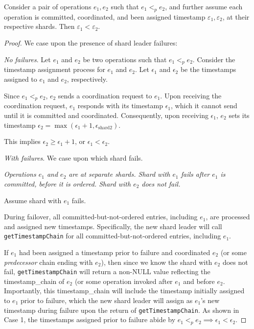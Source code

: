 

\begin{lem}
\label{lemma1}
Consider a pair of operations $e_1, e_2$ such that $e_1 <_p e_2$, and further assume each operation is committed, coordinated, and been assigned timestamp $\varepsilon_1, \varepsilon_2$, at their respective shards. Then $\varepsilon_1 < \varepsilon_2$.
\end{lem}
\begin{proof}
We case upon the presence of shard leader failures:


 \textit{No failures}.
Let $e_1$ and $e_2$ be two operations such that $e_1 <_p e_2$.
Consider the timestamp assignment process for $e_1$ and $e_2$. Let $\epsilon_1$ and $\epsilon_2$ be the timestamps assigned to $e_1$ and $e_2$, respectively.

Since $e_1 <_p e_2$, $e_2$ sends a coordination request to $e_1$. Upon receiving the coordination request, $e_1$ responds with its timestamp $\epsilon_1$, which it cannot send until it is committed and coordinated. Consequently, upon receiving $\epsilon_1$, $e_2$ sets its timestamp $\epsilon_2 = \max(\epsilon_1 + 1, \epsilon_{\text{shard}2})$.

This implies $\epsilon_2 \geq \epsilon_1 + 1$, or $\epsilon_1 < \epsilon_2$.

 \textit{With failures}.
We case upon which shard fails.

 \textit{Operations $e_1$ and $e_2$ are at separate shards. Shard with $e_1$ fails after $e_1$ is \textit{committed}, before it is \textit{ordered}. Shard with $e_2$ does not fail.}

Assume shard with $e_1$ fails.

During failover, all committed-but-not-ordered entries, including $e_1$, are processed and assigned new timestamps. Specifically, the new shard leader will call \texttt{getTimestampChain} for all committed-but-not-ordered entries, including $e_1$.

If $e_1$ had been assigned a timestamp prior to failure and coordinated $e_2$ (or some \textit{predecessor} chain ending with $e_2$), then since we know the shard with $e_2$ does not fail, \texttt{getTimestampChain} will return a non-NULL value reflecting the timestamp\_chain of $e_2$ (or some operation invoked after $e_1$ and before $e_2$. Importantly, this timestamp\_chain will include the timestamp initially assigned to $e_1$ prior to failure, which the new shard leader will assign as $e_1$'s new timestamp during failure upon the return of \texttt{getTimestampChain}. As shown in Case 1, the timestamps assigned prior to failure abide by $e_1 <_p e_2 \implies \epsilon_1 < \epsilon_2$.


\end{proof}

